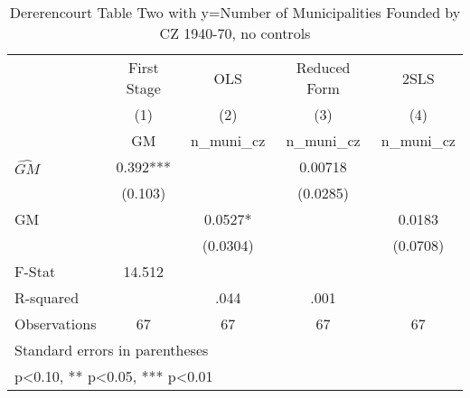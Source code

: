\begin{table}[htbp]\centering
\def\sym#1{\ifmmode^{#1}\else\(^{#1}\)\fi}
\caption{Dererencourt Table Two with y=Number of Municipalities Founded by CZ 1940-70, no controls}
\begin{tabular}{l*{4}{c}}
\toprule
                    & First Stage   &         OLS   &Reduced Form   &        2SLS   \\
                    &\multicolumn{1}{c}{(1)}&\multicolumn{1}{c}{(2)}&\multicolumn{1}{c}{(3)}&\multicolumn{1}{c}{(4)}\\
                    &\multicolumn{1}{c}{GM}&\multicolumn{1}{c}{n\_muni\_cz}&\multicolumn{1}{c}{n\_muni\_cz}&\multicolumn{1}{c}{n\_muni\_cz}\\
\midrule
$\hat{GM}$          &       0.392***&               &     0.00718   &               \\
                    &     (0.103)   &               &    (0.0285)   &               \\
\addlinespace
GM                  &               &      0.0527*  &               &      0.0183   \\
                    &               &    (0.0304)   &               &    (0.0708)   \\
\midrule
F-Stat              &      14.512   &               &               &               \\
R-squared           &               &        .044   &        .001   &               \\
Observations        &          67   &          67   &          67   &          67   \\
\bottomrule
\multicolumn{5}{l}{\footnotesize Standard errors in parentheses}\\
\multicolumn{5}{l}{\footnotesize * p<0.10, ** p<0.05, *** p<0.01}\\
\end{tabular}
\end{table}
